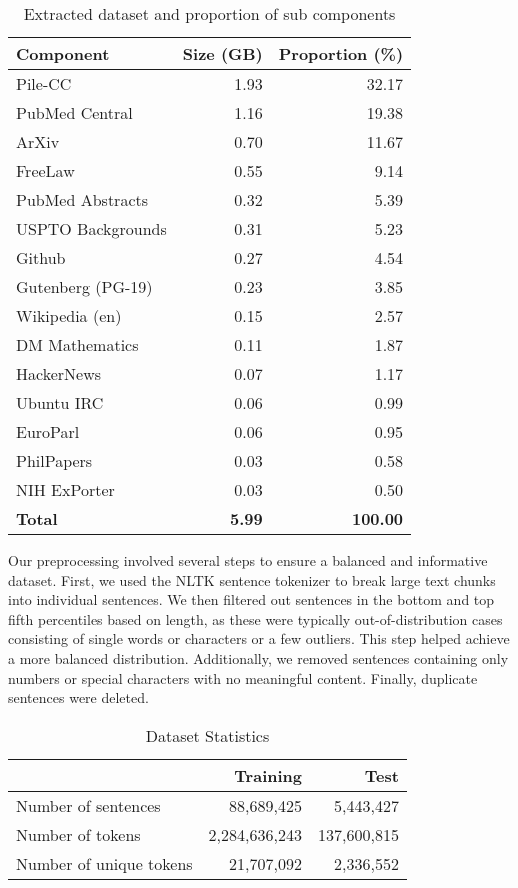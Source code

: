 \begin{table}[h!]
\scriptsize
\centering %
\setlength{\tabcolsep}{6pt}  %
\begin{tabular}{@{}lrr@{}}  %
Component & Size (GB) & Proportion (\%) \\  \hline \hline
Pile-CC             & 1.93  & 32.17 \\
PubMed Central     & 1.16  & 19.38 \\
ArXiv             & 0.70  & 11.67 \\
FreeLaw          & 0.55  &  9.14 \\
PubMed Abstracts    & 0.32  &  5.39 \\
USPTO Backgrounds & 0.31  &  5.23 \\
Github         & 0.27  &  4.54 \\
Gutenberg (PG-19)  & 0.23  &  3.85 \\
Wikipedia (en)      & 0.15  &  2.57 \\
DM Mathematics      & 0.11  &  1.87 \\
HackerNews          & 0.07  &  1.17 \\
Ubuntu IRC          & 0.06  &  0.99 \\
EuroParl            & 0.06  &  0.95 \\
PhilPapers          & 0.03  &  0.58 \\
NIH ExPorter        & 0.03  &  0.50 \\
\hline
\textbf{Total}             & \textbf{5.99} & \textbf{100.00} \\ \hline
\end{tabular}
\caption{Extracted dataset and proportion of sub components}
\label{tab:dataset}
\end{table}

Our preprocessing involved several steps to ensure a balanced and informative dataset. First, we used the NLTK \cite{bird2009natural} sentence tokenizer to break large text chunks into individual sentences. We then filtered out sentences in the bottom and top fifth percentiles based on length, as these were typically out-of-distribution cases consisting of single words or characters or a few outliers. This step helped achieve a more balanced distribution. Additionally, we removed sentences containing only numbers or special characters with no meaningful content. Finally, duplicate sentences were deleted.

\begin{table}[h]
\scriptsize
\centering
\setlength{\tabcolsep}{6pt}  
\begin{tabular}{@{}lrr@{}}  %
\textbf{} & Training & Test \\
\hline \hline
Number of sentences & 88{,}689{,}425 & 5{,}443{,}427 \\
Number of tokens & 2{,}284{,}636{,}243 & 137{,}600{,}815 \\
Number of unique tokens & 21{,}707{,}092 & 2{,}336{,}552 \\
\hline
\end{tabular}
\caption{Dataset Statistics}
\label{tab:dataset-stats}
\end{table}

